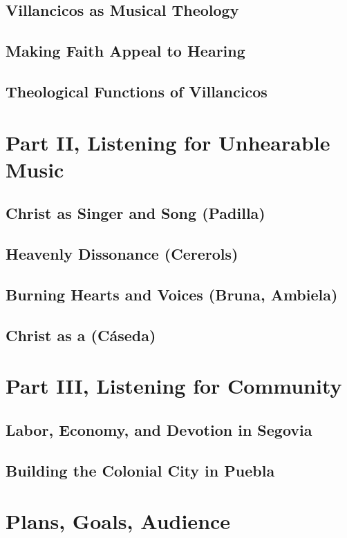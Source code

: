 \documentclass{vcbook-proposal}
\begin{document}
\subsection{Villancicos as Musical Theology}

\subsection{Making Faith Appeal to Hearing}

\subsection{Theological Functions of Villancicos}


\section{Part II, Listening for Unhearable Music}

\subsection{Christ as Singer and Song (Padilla)}

\subsection{Heavenly Dissonance (Cererols)}

\subsection{Burning Hearts and Voices (Bruna, Ambiela)}

\subsection{Christ as a  (Cáseda)}


\section{Part III, Listening for Community}

\subsection{Labor, Economy, and Devotion in Segovia}

\subsection{Building the Colonial City in Puebla}

\section{Plans, Goals, Audience}


\printbibliography
\end{document}
